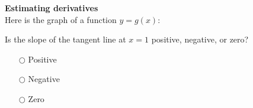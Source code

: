 \documentclass[pdftex, brazil, 12pt, twoside]{article}
\begin{document}
\begin{exercise}
  \textbf{Estimating derivatives}\\%
  Here is the graph of a function $y=g(x)$:
  \begin{figure}[H]
    \begin{center}
    \end{center}
  \end{figure}
  Is the slope of the tangent line at $x=1$ positive, negative, or zero?
  \begin{itemize}[noitemsep]
  \item[$\bigcirc$] Positive
  \item[$\bigcirc$] Negative
  \item[$\bigcirc$] Zero
  \end{itemize}
\end{exercise}
\end{document}
